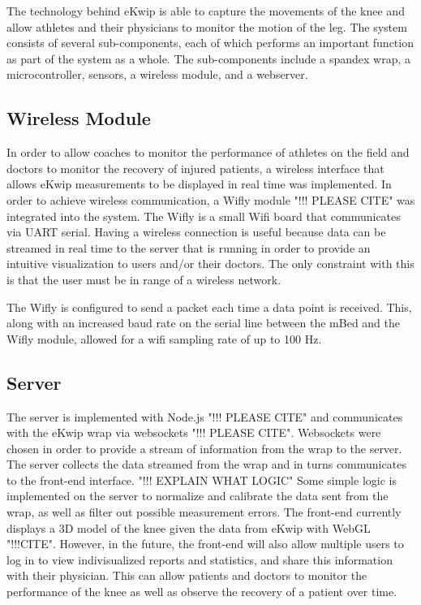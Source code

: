 The technology behind eKwip is able to capture the movements of the knee and allow athletes and their physicians to monitor the motion of the leg. The system consists of several sub-components, each of which performs an important function as part of the system as a whole. The sub-components include a spandex wrap, a microcontroller, sensors, a wireless module, and a webserver.

\subsection {Wireless Module}
In order to allow coaches to monitor the performance of athletes on the field and doctors to monitor the recovery of injured patients, a wireless interface that allows eKwip measurements to be displayed in real time was implemented. In order to achieve wireless communication, a Wifly module "!!! PLEASE CITE" was integrated into the system. The Wifly is a small Wifi board that communicates via UART serial. Having a wireless connection is useful because data can be streamed in real time to the server that is running in order to provide an intuitive visualization to users and/or their doctors. The only constraint with this is that the user must be in range of a wireless network.

The Wifly is configured to send a packet each time a data point is received. This, along with an increased baud rate on the serial line between the mBed and the Wifly module, allowed for a wifi sampling rate of up to 100 Hz.

\subsection {Server}
The server is implemented with Node.js "!!! PLEASE CITE" and communicates with the eKwip wrap via websockets "!!! PLEASE CITE". Websockets were chosen in order to provide a stream of information from the wrap to the server. The server collects the data streamed from the wrap and in turns communicates to the front-end interface. "!!! EXPLAIN WHAT LOGIC" Some simple logic is implemented on the server to normalize and calibrate the data sent from the wrap, as well as filter out possible measurement errors. The front-end currently displays a 3D model of the knee given the data from eKwip with WebGL "!!!CITE". However, in the future, the front-end will also allow multiple users to log in to view indivisualized reports and statistics, and share this information with their physician. This can allow patients and doctors to monitor the performance of the knee as well as observe the recovery of a patient over time.
